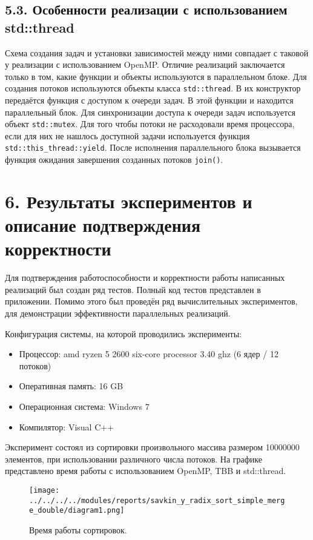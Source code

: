 \documentclass{report}
\begin{document}
    \subsection*{5.3. Особенности реализации с использованием std::thread}
    \par Схема создания задач и установки зависимостей между ними совпадает с таковой у реализации с использованием OpenMP.
         Отличие реализаций заключается только в том, какие функции и объекты используются в параллельном блоке.
         Для создания потоков используются объекты класса \verb|std::thread|. В их конструктор передаётся функция с доступом к очереди задач. В этой функции и находится параллельный блок.
         Для синхронизации доступа к очереди задач используется объект \verb|std::mutex|.
         Для того чтобы потоки не расходовали время процессора, если для них не нашлось доступной задачи используется функция \verb|std::this_thread::yield|.
         После исполнения параллельного блока вызывается функция ожидания завершения созданных потоков \verb|join()|.


    \newpage
    \section*{6. Результаты экспериментов и описание подтверждения корректности}
    \par Для подтверждения работоспособности и корректности работы написанных реализаций был создан ряд тестов. Полный код тестов представлен в приложении.
         Помимо этого был проведён ряд вычислительных экспериментов, для демонстрации эффективности параллельных реализаций.
    \par Конфигурация системы, на которой проводились эксперименты:
    \begin{itemize}
        \item Процессор: amd ryzen 5 2600 six-core processor 3.40 ghz (6 ядер / 12 потоков)
        \item Оперативная память: 16 GB
        \item Операционная система: Windows 7
        \item Компилятор: Visual C++
    \end{itemize}

    \par Эксперимент состоял из сортировки произвольного массива размером 10000000 элементов, при использовании различного числа потоков.
         На графике представлено время работы с использованием OpenMP, TBB и std::thread.
    \begin{figure}[htbp]
        \centering
        \texttt{[image: ../../../../modules/reports/savkin\_y\_radix\_sort\_simple\_merge\_double/diagram1.png]}
        \caption{Время работы сортировок.}
    \end{figure}
\end{document}
